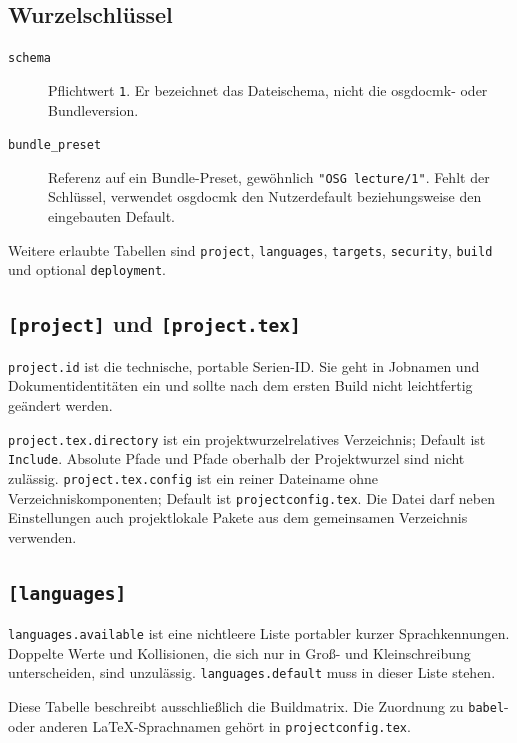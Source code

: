 \documentclass[
load-preamble+
]{osgdoc}
\begin{document}
\subsection{Wurzelschlüssel}

\begin{description}
\item[\texttt{schema}] Pflichtwert \texttt{1}. Er bezeichnet das
  Dateischema, nicht die osgdocmk- oder Bundleversion.
\item[\texttt{bundle\_preset}] Referenz auf ein Bundle-Preset, gewöhnlich
  \verb|"OSG lecture/1"|. Fehlt der Schlüssel, verwendet osgdocmk den
  Nutzerdefault beziehungsweise den eingebauten Default.
\end{description}

Weitere erlaubte Tabellen sind \texttt{project}, \texttt{languages},
\texttt{targets}, \texttt{security}, \texttt{build} und optional
\texttt{deployment}.

\subsection{\texttt{[project]} und \texttt{[project.tex]}}

\verb|project.id| ist die technische, portable Serien-ID. Sie geht in
Jobnamen und Dokumentidentitäten ein und sollte nach dem ersten Build nicht
leichtfertig geändert werden.

\verb|project.tex.directory| ist ein projektwurzelrelatives Verzeichnis;
Default ist \texttt{Include}. Absolute Pfade und Pfade oberhalb der
Projektwurzel sind nicht zulässig. \verb|project.tex.config| ist ein reiner
Dateiname ohne Verzeichniskomponenten; Default ist
\texttt{projectconfig.tex}. Die Datei darf neben Einstellungen auch
projektlokale Pakete aus dem gemeinsamen Verzeichnis verwenden.

\subsection{\texttt{[languages]}}

\verb|languages.available| ist eine nichtleere Liste portabler kurzer
Sprachkennungen. Doppelte Werte und Kollisionen, die sich nur in Groß- und
Kleinschreibung unterscheiden, sind unzulässig. \verb|languages.default|
muss in dieser Liste stehen.

Diese Tabelle beschreibt ausschließlich die Buildmatrix. Die Zuordnung zu
\texttt{babel}- oder anderen LaTeX-Sprachnamen gehört in
\texttt{projectconfig.tex}.
\end{document}
